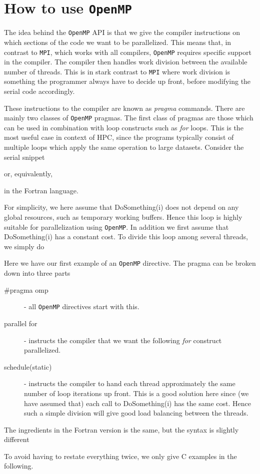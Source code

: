 \documentclass[twoside, 11pt, a4paper]{article}
\begin{document}
\section{How to use \texttt{OpenMP}}
The idea behind the \texttt{OpenMP} API is that we give the compiler instructions on which sections of the code
we want to be parallelized. This means that, in contrast to \texttt{MPI}, which works with all compilers, 
\texttt{OpenMP} requires specific support in the compiler.
The compiler then handles work division between the available number of threads. This is in stark 
contrast to \texttt{MPI} where work division is something the programmer
always have to decide up front, before modifying the serial code accordingly. 

These instructions to the compiler are known as \emph{pragma} commands. There are mainly
two classes of \texttt{OpenMP} pragmas. The first class of pragmas are those which can be used in combination 
with loop constructs such as \emph{for} loops. This is the most useful case in context 
of HPC, since the programs typically consist of multiple loops which apply the same operation
to large datasets. Consider the serial snippet

or, equivalently,

in the Fortran language.

For simplicity, we here assume that DoSomething(i) does not depend on any global resources,
such as temporary working buffers. Hence this loop is highly suitable for parallelization
using \texttt{OpenMP}. In addition we first assume that DoSomething(i) has a constant cost.
To divide this loop among several threads, we simply do

Here we have our first example of an \texttt{OpenMP} directive. The pragma can be broken down
into three parts
\begin{description}
	\item[\#pragma omp] - all \texttt{OpenMP} directives start with this.
	\item[parallel for] - instructs the compiler that we want the following
						  \emph{for} construct parallelized.
	\item[schedule(static)] - instructs the compiler to hand each thread approximately
							  the same number of loop iterations up front. This is a good solution
							  here since (we have assumed that) each call to DoSomething(i) has
							  the same cost. Hence such a simple division will give
							  good load balancing between the threads.
\end{description}
The ingredients in the Fortran version is the same, but the syntax is slightly different
\newpage

To avoid having to restate everything twice, we only give C examples in the following.
\end{document}
